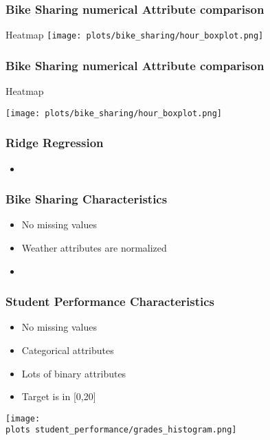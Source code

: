 \documentclass[aspectratio=169]{beamer}
\def \plots {./plots/}
\begin{document}
\begin{frame}
\frametitle{Bike Sharing numerical Attribute comparison}
\begin{minipage}{0.3\textwidth}
	
\end{minipage}
\begin{minipage}{0.69\textwidth}
	\center Heatmap
	\texttt{[image: plots/bike\_sharing/hour\_boxplot.png]}
\end{minipage}
\end{frame}

\begin{frame}
\frametitle{Bike Sharing numerical Attribute comparison}
\center Heatmap
\begin{minipage}{1\textwidth}
	\center 
	\texttt{[image: plots/bike\_sharing/hour\_boxplot.png]}
\end{minipage}
\end{frame}

\begin{frame}
\frametitle{Ridge Regression}
\begin{itemize}
\item 
\end{itemize}
\end{frame}

\begin{frame}{}
\frametitle{Bike Sharing Characteristics}
\begin{itemize}
\item No missing values
\item Weather attributes are normalized
\item 
\end{itemize}
\end{frame}


\begin{frame}{}
\frametitle{Student Performance Characteristics}
\begin{minipage}{0.45\textwidth}
\begin{itemize}
\item No missing values
\item Categorical attributes
\item Lots of binary attributes
\item Target is in [0,20]
\end{itemize}
\end{minipage}
\begin{minipage}{0.5\textwidth}
    \texttt{[image: \\plots student\_performance/grades\_histogram.png]}
\end{minipage}
\end{frame}
\end{document}

